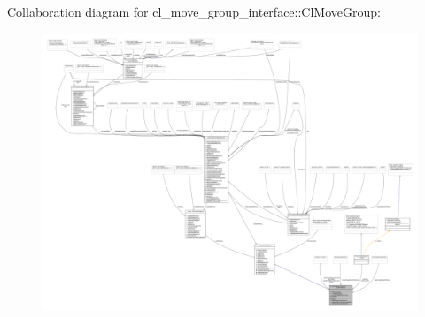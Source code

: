 Collaboration diagram for cl\+\_\+move\+\_\+group\+\_\+interface\+:\+:Cl\+Move\+Group\+:
\nopagebreak
\begin{figure}[H]
\begin{center}
\leavevmode
\includegraphics[width=350pt]{classcl__move__group__interface_1_1ClMoveGroup__coll__graph}
\end{center}
\end{figure}

